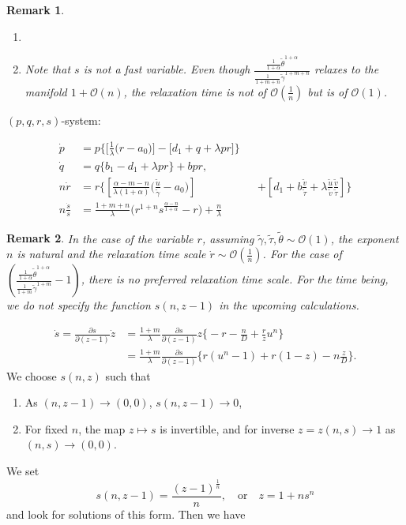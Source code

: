 \documentclass[a4paper,11pt]{article}
\def\tg{{\tilde{\gamma}}}
\def\tv{{\tilde{v}}}
\def\tth{{\tilde{\theta}}}
\def\ts{{\tilde{\tau}}}
\def\tu{{\tilde{u}}}
\def\dpp{\dot{p}}
\def\dqq{\dot{q}}
\def\drr{\dot{r}}
\newtheorem{remark}{Remark}[section]
\begin{document}
\begin{remark}
 \begin{enumerate}
  \item 
  \item Note that $s$ is not a fast variable. Even though $\displaystyle\frac{ \frac{1}{1+\alpha} \tth^{1+\alpha} }{ \frac{1}{1+m+n} \tg^{1+m+n} }$ relaxes to the manifold $1 + \mathcal{O}(n)$, the relaxation time is not of $\mathcal{O}(\frac{1}{n})$ but is of $\mathcal{O}(1)$.
  
 \end{enumerate}
\end{remark}



$(p,q,r,s)$-system:

\begin{equation}
\begin{aligned}
  {\dpp}&=p\bigg\{\Big[\frac{1}{\lambda }\Big(r-a_0\Big)\Big] -\Big[d_1 + q + \lambda p r\Big]\bigg\}\\
  {\dqq}&=q\bigg\{b_1-d_1 + \lambda p r\bigg\} +bpr,\\
 n{\drr}&=r\bigg\{\left[\frac{\alpha-m-n}{\lambda(1+\alpha) }\Big(\frac{\tu}{\tg}-a_0\Big)\right]& &+\left[d_1 + b\frac{\tv}{\ts} + \lambda\frac{\tu}{\tv}\frac{\tv}{\ts}\right]\bigg\}\\
 n\frac{\dot{s}}{s} &= \frac{1+m+n}{\lambda}\Big(r^{1+n}s^{\frac{\alpha-n}{1+\alpha}} - r \Big) + \frac{n}{\lambda}
\end{aligned}
\end{equation}

\begin{remark}
 In the case of the variable $r$, assuming $\tg, \ts,\tth \sim \mathcal{O}(1)$, the exponent $n$ is natural and the relaxation time scale $\drr \sim \mathcal{O}(\frac{1}{n})$. For the case of $\displaystyle\left(\frac{ \frac{1}{1+\alpha}\tth^{1+\alpha}}{ \frac{1}{1+m}\tg^{1+m} } -1 \right)$, there is no preferred relaxation time scale. For the time being, we do not specify the function $s(n,z-1)$ in the upcoming calculations.
\end{remark}
\begin{align*}
 \dot{s} =\frac{\partial s}{\partial (z-1)} \dot{z}
 &= \frac{1+m}{\lambda}\frac{\partial s}{\partial (z-1)} z\bigg\{-r - \frac{n}{D}+ \frac{r}{z}u^n\bigg\}\\
 &=\frac{1+m}{\lambda}\frac{\partial s}{\partial (z-1)} \bigg\{r(u^n-1) +r(1-z) -n\frac{z}{D}\bigg\}.
\end{align*}
We choose $s(n,z)$ such that
\begin{enumerate}
 \item As $(n,z-1) \rightarrow (0,0)$, $s(n,z-1) \rightarrow 0$, 
 \item For fixed $n$, the map $z \mapsto s$ is invertible, and for inverse $z=z(n,s)\rightarrow 1$ as $(n,s) \rightarrow (0,0)$.
\end{enumerate}
We set 
$$ s(n,z-1) = \frac{(z-1)^{\frac{1}{n}}}{n}, \quad \text{or} \quad z= 1+ns^n$$
and look for solutions of this form. Then we have
\end{document}
